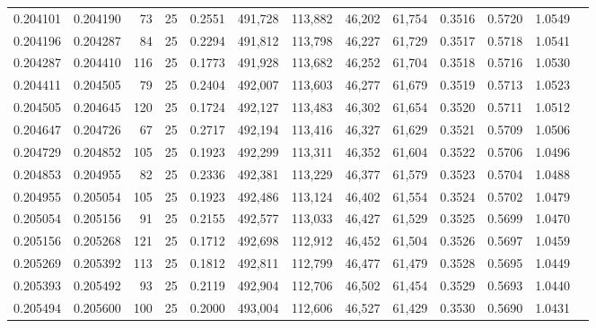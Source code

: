 \begin{tabular}{rrrrrrrrrrrrr}
0.204101 & 0.204190 &    73 &  25 &                                     0.2551 & 491,728 & 113,882 &  46,202 &  61,754 & 0.3516 & 0.5720 & 1.0549 \\
0.204196 & 0.204287 &    84 &  25 &                                     0.2294 & 491,812 & 113,798 &  46,227 &  61,729 & 0.3517 & 0.5718 & 1.0541 \\
0.204287 & 0.204410 &   116 &  25 &                                     0.1773 & 491,928 & 113,682 &  46,252 &  61,704 & 0.3518 & 0.5716 & 1.0530 \\
0.204411 & 0.204505 &    79 &  25 &                                     0.2404 & 492,007 & 113,603 &  46,277 &  61,679 & 0.3519 & 0.5713 & 1.0523 \\
0.204505 & 0.204645 &   120 &  25 &                                     0.1724 & 492,127 & 113,483 &  46,302 &  61,654 & 0.3520 & 0.5711 & 1.0512 \\
0.204647 & 0.204726 &    67 &  25 &                                     0.2717 & 492,194 & 113,416 &  46,327 &  61,629 & 0.3521 & 0.5709 & 1.0506 \\
0.204729 & 0.204852 &   105 &  25 &                                     0.1923 & 492,299 & 113,311 &  46,352 &  61,604 & 0.3522 & 0.5706 & 1.0496 \\
0.204853 & 0.204955 &    82 &  25 &                                     0.2336 & 492,381 & 113,229 &  46,377 &  61,579 & 0.3523 & 0.5704 & 1.0488 \\
0.204955 & 0.205054 &   105 &  25 &                                     0.1923 & 492,486 & 113,124 &  46,402 &  61,554 & 0.3524 & 0.5702 & 1.0479 \\
0.205054 & 0.205156 &    91 &  25 &                                     0.2155 & 492,577 & 113,033 &  46,427 &  61,529 & 0.3525 & 0.5699 & 1.0470 \\
0.205156 & 0.205268 &   121 &  25 &                                     0.1712 & 492,698 & 112,912 &  46,452 &  61,504 & 0.3526 & 0.5697 & 1.0459 \\
0.205269 & 0.205392 &   113 &  25 &                                     0.1812 & 492,811 & 112,799 &  46,477 &  61,479 & 0.3528 & 0.5695 & 1.0449 \\
0.205393 & 0.205492 &    93 &  25 &                                     0.2119 & 492,904 & 112,706 &  46,502 &  61,454 & 0.3529 & 0.5693 & 1.0440 \\
0.205494 & 0.205600 &   100 &  25 &                                     0.2000 & 493,004 & 112,606 &  46,527 &  61,429 & 0.3530 & 0.5690 & 1.0431 \\

\end{tabular}
